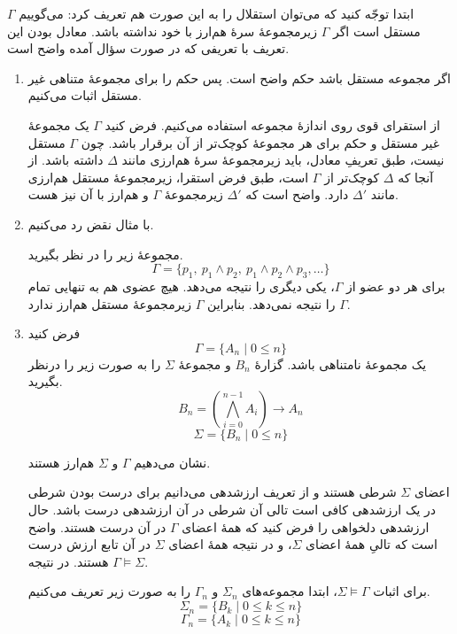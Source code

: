 \begin{ans}
  ابتدا توجّه کنید که می‌توان استقلال را به این صورت هم تعریف کرد: می‌گوییم $\Gamma$ مستقل است اگر $\Gamma$ زیرمجموعهٔ سرهٔ هم‌ارز با خود نداشته باشد. معادل بودن این تعریف با تعریفی که در صورت سؤال آمده واضح است.
  \begin{enumerate}
    \item
    اگر مجموعه مستقل باشد حکم واضح است. پس حکم را برای مجموعهٔ متناهی غیر مستقل اثبات می‌کنیم.

    از استقرای قوی روی اندازهٔ مجموعه استفاده می‌کنیم. فرض کنید $\Gamma$ یک مجموعهٔ غیر مستقل و حکم برای هر مجموعهٔ کوچک‌تر از آن برقرار باشد.
    چون $\Gamma$ مستقل نیست، طبق تعریفِ معادل، باید زیرمجموعهٔ سرهٔ هم‌ارزی مانند $\Delta$ داشته باشد. از آنجا که $\Delta$ کوچک‌تر از $\Gamma$ است، طبق فرض استقرا، زیرمجموعهٔ مستقل هم‌ارزی مانند $\Delta'$ دارد. واضح است که $\Delta'$ زیرمجموعهٔ $\Gamma$ و هم‌ارز با آن نیز هست.

    \item
    با مثال نقض رد می‌کنیم.

    مجموعهٔ زیر را در نظر بگیرید.
    $$ \Gamma = \{p_1,~ p_1 \wedge p_2,~ p_1 \wedge p_2 \wedge p_3, \dots \} $$
    برای هر دو عضو از $\Gamma$، یکی دیگری را نتیجه می‌دهد. هیچ عضوی هم به تنهایی تمام $\Gamma$ را نتیجه نمی‌دهد. بنابراین $\Gamma$ زیرمجموعهٔ مستقل هم‌ارز ندارد.

    \item
    فرض کنید
    $$ \Gamma = \{ A_n \mid 0 \leq n \} $$
    یک مجموعهٔ نامتناهی باشد.
    گزارهٔ $B_n$ و مجموعهٔ $\Sigma$ را به صورت زیر را درنظر بگیرید.
    $$ B_n = (\bigwedge_{i=0}^{n-1} A_i) \rightarrow A_n $$
    $$ \Sigma = \{ B_n \mid 0 \leq n \} $$

    نشان می‌دهیم $\Gamma$ و $\Sigma$ هم‌ارز هستند.

    اعضای $\Sigma$ شرطی هستند و از تعریف ارزشدهی می‌دانیم برای درست بودن شرطی در یک ارزشدهی کافی است تالی آن شرطی در آن ارزشدهی درست باشد. حال ارزشدهی دلخواهی را فرض کنید که همهٔ اعضای $\Gamma$ در آن درست هستند. واضح است که تالیِ همهٔ اعضای $\Sigma$، و در نتیجه همهٔ اعضای $\Sigma$ در آن تابع ارزش درست هستند. در نتیجه $\Gamma \models \Sigma$.

    برای اثبات $\Sigma \models \Gamma$، ابتدا
    مجموعه‌های $\Sigma_n$ و $\Gamma_n$ را به صورت زیر تعریف می‌کنیم.
    $$ \Sigma_n = \{ B_k \mid 0 \leq k \leq n \} $$
    $$ \Gamma_n = \{ A_k \mid 0 \leq k \leq n \} $$


\end{enumerate}
\end{ans}
